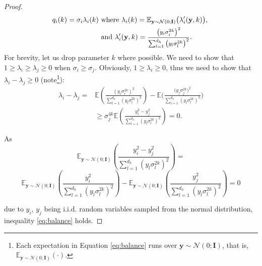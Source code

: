 \begin{proof}
\vspace{-0.3cm}
\begin{equation}
\begin{aligned}
\label{eq:balanceq}
    q_{i}(k)=\sigma_{i} \lambda_{i}(k)  &\text{ where }  \lambda_{i}(k)=\mathbb{E}_{\mathbf{y}\sim\mathcal{N}(0;\mathbf{I})}\big(\lambda'_i(\mathbf{y},k)\big), \; \\
    &{\text{ and }} \lambda'_i(\mathbf{y},k)=
    \text{\fontsize{8}{8}\selectfont$\frac{\left(y_{i} \sigma_{i}^{2k}\right)^{2}}{ \sum_{l=1}^{d_h}\left(y_{l} \sigma_{l}^{2k}\right)^{2}}$}.
    \end{aligned}
\end{equation}
For brevity, let us drop parameter $k$ where possible. We need to show that $1 \geq \lambda_i \geq \lambda_j\geq 0$ when $\sigma_i \geq \sigma_j$. Obviously, $1 \geq\lambda_i\geq0$, thus we need to show that $\lambda_i-\lambda_j\geq 0$ (note\footnote{Each expectation in Equation \eqref{eq:balance} runs over ${\mathbf{y}\sim\mathcal{N}(0;\mathbf{I})}$, that is, $\mathbb{E}_{\mathbf{y}\sim\mathcal{N}(0;\mathbf{I})}(\cdot)$.}):
\begin{equation}
\label{eq:balance}
\begin{aligned}
          \lambda_i - \lambda_j =& \mathbb{E}\left(\frac{\left(y_{i} \sigma_{i}^{2k}\right)^{2}}{ \sum_{l=1}^{d_h}\left(y_{l} \sigma_{l}^{2k}\right)^{2}}\right)-\mathbb{E}
          \Bigg(\frac{\big(y_{j} \sigma_{j}^{2k}\big)^{2}}{ \sum_{l=1}^{d_h}\left(y_{l}\sigma_{l}^{2k}\right)^{2}}\Bigg)\\
          &\geq \sigma_{j}^{4k} \mathbb{E}\left(\frac{y^{2}_i - y^{2}_j}{ \sum_{l=1}^{d_h}\left(y_{l} \sigma_{l}^{2k}\right)^{2}}\right) = 0.
\end{aligned}
\end{equation}


As $$\mathbb{E}_{\mathbf{y}\sim\mathcal{N}(0;\mathbf{I})}\!\left(\frac{y^{2}_i - y^{2}_j}{ \sum_{l=1}^{d_h}\left(y_{l} \sigma_{l}^{2k}\right)^{2}}\right)=$$ 
%
 $$\mathbb{E}_{\mathbf{y}\sim\mathcal{N}(0;\mathbf{I})}\!\left(\frac{y^{2}_i}{ \sum_{l=1}^{d_h}\left(y_{l} \sigma_{l}^{2k}\right)^{2}}\right)\!-\!
  \mathbb{E}_{\mathbf{y}\sim\mathcal{N}(0;\mathbf{I})}\!\left(\frac{y^{2}_j}{ \sum_{l=1}^{d_h}\left(y_{l} \sigma_{l}^{2k}\right)^{2}}\right)
\!=\!0$$ 

\noindent
due to
  $y_i$, $y_j$ being i.i.d. random variables sampled from the normal distribution,  inequality \eqref{eq:balance} holds. %
\end{proof}
